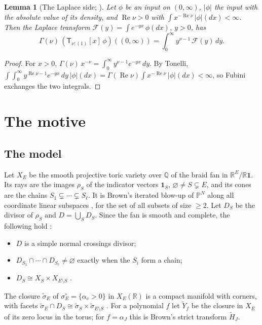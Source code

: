 \documentclass[11pt]{article}
\theoremstyle{plain}
\newtheorem{lemma}[prop]{Lemma}
\theoremstyle{definition}
\theoremstyle{remark}
\newcommand{\Q}{\mathbb Q}
\newcommand{\R}{\mathbb R}
\newcommand{\PP}{\mathbb P}
\newcommand{\tsig}{\widetilde\sigma}
\newcommand{\sT}{\mathsf T}
\newcommand{\Tx}[3]{(\sT_{#1;(1)}[x]\,#2)((#3,\infty))}
\DeclareMathOperator{\re}{Re}
\begin{document}
\begin{lemma}[The Laplace side; {\cite[Thm.~5.11, p.~31]{F}}]\label{lem:laplace}
Let $\phi$ be an input on $(0,\infty)$, $|\phi|$ the input with the absolute value of its density, and $\re\nu>0$ with $\int x^{-\re\nu}\,|\phi|(dx)<\infty$. Then the Laplace transform $\mathcal F(y)=\int e^{-yx}\,\phi(dx)$, $y>0$, has
\[
\Gamma(\nu)\,\Tx{\nu}{\phi}{0}=\int_0^\infty y^{\nu-1}\,\mathcal F(y)\,dy .
\]
\end{lemma}

\begin{proof}
For $x>0$, $\Gamma(\nu)\,x^{-\nu}=\int_0^\infty y^{\nu-1}e^{-yx}\,dy$. By Tonelli, $\int\!\!\int_0^\infty y^{\re\nu-1}e^{-yx}\,dy\,|\phi|(dx)=\Gamma(\re\nu)\int x^{-\re\nu}\,|\phi|(dx)<\infty$, so Fubini exchanges the two integrals.
\end{proof}

\section{The motive}\label{sec:motive}

\subsection{The model}\label{sec:model}

Let $X_E$ be the smooth projective toric variety over $\Q$ of the braid fan in $\R^E/\R\mathbf 1$. Its rays are the images $\rho_S$ of the indicator vectors $\mathbf 1_S$, $\varnothing\neq S\subsetneq E$, and its cones are the chains $S_1\subsetneq\cdots\subsetneq S_\ell$. It is Brown's iterated blow-up of $\PP^{N}$ along all coordinate linear subspaces \cite[\S5.1]{B2}, for the set of all subsets of size $\ge2$. Let $D_S$ be the divisor of $\rho_S$ and $D=\bigcup_SD_S$. Since the fan is smooth and complete, the following hold \cite[\S5]{B2}:
\begin{itemize}
\item $D$ is a simple normal crossings divisor;
\item $D_{S_1}\cap\cdots\cap D_{S_\ell}\neq\varnothing$ exactly when the $S_i$ form a chain;
\item $D_S\cong X_S\times X_{E\setminus S}$ \cite[Thm.~5.1]{B2}.
\end{itemize}
The closure $\tsig_E$ of $\sigma_E^\circ=\{\alpha_e>0\}$ in $X_E(\R)$ is a compact manifold with corners, with facets $\tsig_E\cap D_S\cong\tsig_S\times\tsig_{E\setminus S}$ \cite[Cor.~5.2]{B2}. For a polynomial $f$ let $\widetilde Y_f$ be the closure in $X_E$ of its zero locus in the torus; for $f=\alpha_J$ this is Brown's strict transform $\widetilde H_J$.
\end{document}
